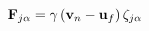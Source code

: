 \documentclass[12pt]{article}
\begin{document}
$$ 
{\bf F}_{j \alpha} = \gamma \left({\bf v}_n - {\bf u}_f \right) \zeta_{j\alpha}
$$
\end{document}
